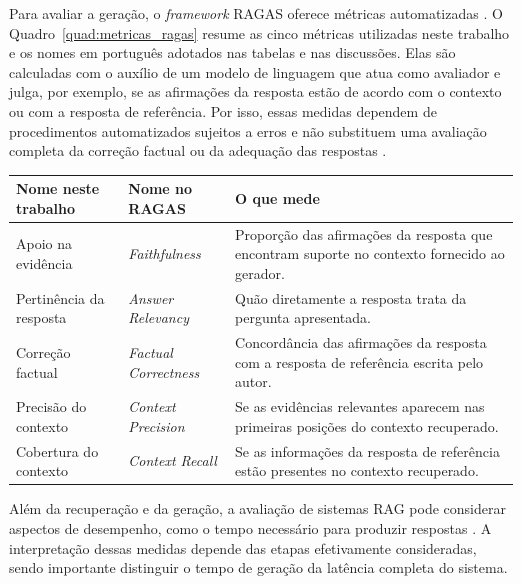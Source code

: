 Para avaliar a geração, o \textit{framework} RAGAS oferece métricas automatizadas . O Quadro~\ref{quad:metricas_ragas} resume as cinco métricas utilizadas neste trabalho e os nomes em português adotados nas tabelas e nas discussões. Elas são calculadas com o auxílio de um modelo de linguagem que atua como avaliador e julga, por exemplo, se as afirmações da resposta estão de acordo com o contexto ou com a resposta de referência. Por isso, essas medidas dependem de procedimentos automatizados sujeitos a erros e não substituem uma avaliação completa da correção factual ou da adequação das respostas .

\begin{quadro}[H]
\centering
\caption{Métricas do RAGAS utilizadas e nomes adotados neste trabalho.}
\label{quad:metricas_ragas}
\begingroup
\small
\renewcommand{\arraystretch}{1.2}
\begin{tabularx}{\textwidth}{|p{3.2cm}|p{3.2cm}|X|}
\hline
\textbf{Nome neste trabalho} & \textbf{Nome no RAGAS} & \textbf{O que mede} \\
\hline
Apoio na evidência & \textit{Faithfulness} & Proporção das afirmações da resposta que encontram suporte no contexto fornecido ao gerador. \\
\hline
Pertinência da resposta & \textit{Answer Relevancy} & Quão diretamente a resposta trata da pergunta apresentada. \\
\hline
Correção factual & \textit{Factual Correctness} & Concordância das afirmações da resposta com a resposta de referência escrita pelo autor. \\
\hline
Precisão do contexto & \textit{Context Precision} & Se as evidências relevantes aparecem nas primeiras posições do contexto recuperado. \\
\hline
Cobertura do contexto & \textit{Context Recall} & Se as informações da resposta de referência estão presentes no contexto recuperado. \\
\hline
\end{tabularx}
\endgroup
{}
\end{quadro}

Além da recuperação e da geração, a avaliação de sistemas RAG pode considerar aspectos de desempenho, como o tempo necessário para produzir respostas . A interpretação dessas medidas depende das etapas efetivamente consideradas, sendo importante distinguir o tempo de geração da latência completa do sistema.
